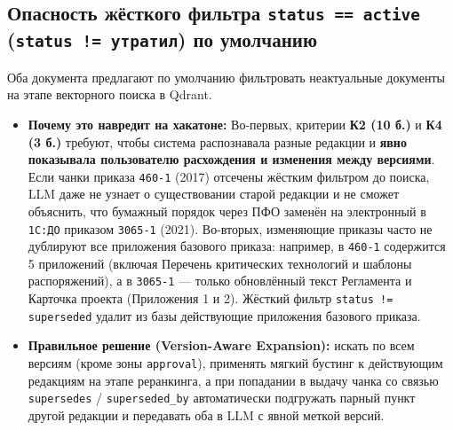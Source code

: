 \documentclass[10pt,a4paper]{article}
\begin{document}
\subsection{Опасность жёсткого фильтра \texttt{status == active} (\texttt{status != утратил}) по умолчанию}
Оба документа предлагают по умолчанию фильтровать неактуальные документы на этапе векторного поиска в Qdrant.
\begin{itemize}
    \item \textbf{Почему это навредит на хакатоне:}
    Во-первых, критерии \textbf{К2 (10 б.)} и \textbf{К4 (3 б.)} требуют, чтобы система распознавала разные редакции и \textbf{явно показывала пользователю расхождения и изменения между версиями}. Если чанки приказа \texttt{460-1} (2017) отсечены жёстким фильтром до поиска, LLM даже не узнает о существовании старой редакции и не сможет объяснить, что бумажный порядок через ПФО заменён на электронный в \texttt{1С:ДО} приказом \texttt{3065-1} (2021).
    Во-вторых, изменяющие приказы часто не дублируют все приложения базового приказа: например, в \texttt{460-1} содержится 5 приложений (включая Перечень критических технологий и шаблоны распоряжений), а в \texttt{3065-1} — только обновлённый текст Регламента и Карточка проекта (Приложения 1 и 2). Жёсткий фильтр \texttt{status != superseded} удалит из базы действующие приложения базового приказа.
    \item \textbf{Правильное решение (Version-Aware Expansion):} искать по всем версиям (кроме зоны \texttt{approval}), применять мягкий бустинг к действующим редакциям на этапе реранкинга, а при попадании в выдачу чанка со связью \texttt{supersedes} / \texttt{superseded\_by} автоматически подгружать парный пункт другой редакции и передавать оба в LLM с явной меткой версий.
\end{itemize}
\end{document}
